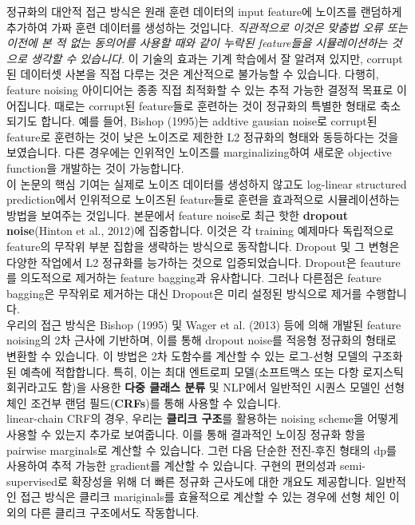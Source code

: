 \documentclass{article}
\begin{document}
정규화의 대안적 접근 방식은 원래 훈련 데이터의 input feature에 노이즈를 랜덤하게 추가하여 가짜 훈련 데이터를 생성하는 것입니다. \textit{직관적으로 이것은 맞춤법 오류 또는 이전에 본 적 없는 동의어를 사용할 때와 같이 누락된 feature들을 시뮬레이션하는 것으로 생각할 수 있습니다.} 이 기술의 효과는 기계 학습에서 잘 알려져 있지만, corrupt된 데이터셋 사본을 직접 다루는 것은 계산적으로 불가능할 수 있습니다. 다행히, feature noising 아이디어는 종종 직접 최적화할 수 있는 추적 가능한 결정적 목표로 이어집니다. 때로는 corrupt된 feature들로 훈련하는 것이 정규화의 특별한 형태로 축소되기도 합니다. 예를 들어, Bishop (1995)는 addtive gausian noise로 corrupt된 feature로 훈련하는 것이 낮은 노이즈로 제한한 L2 정규화의 형태와 동등하다는 것을 보였습니다. 다른 경우에는 인위적인 노이즈를 marginalizing하여 새로운 objective function을 개발하는 것이 가능합니다.\\

이 논문의 핵심 기여는 실제로 노이즈 데이터를 생성하지 않고도 log-linear structured prediction에서 인위적으로 노이즈된 feature들로 훈련을 효과적으로 시뮬레이션하는 방법을 보여주는 것입니다. 본문에서 feature noise로 최근 핫한 \textbf{dropout noise}(Hinton et al., 2012)에 집중합니다. 이것은 각 training 예제마다 독립적으로 feature의 무작위 부분 집합을 생략하는 방식으로 동작합니다. Dropout 및 그 변형은 다양한 작업에서 L2 정규화를 능가하는 것으로 입증되었습니다. Dropout은 feauture를 의도적으로 제거하는 feature bagging과 유사합니다. 그러나 다른점은 feature bagging은 무작위로 제거하는 대신 Dropout은 미리 설정된 방식으로 제거를 수행합니다.\\

우리의 접근 방식은 Bishop (1995) 및 Wager et al. (2013) 등에 의해 개발된 feature noising의 2차 근사에 기반하며, 이를 통해 dropout noise를 적응형 정규화의 형태로 변환할 수 있습니다. 이 방법은 2차 도함수를 계산할 수 있는 로그-선형 모델의 구조화된 예측에 적합합니다. 특히, 이는 최대 엔트로피 모델(소프트맥스 또는 다항 로지스틱 회귀라고도 함)을 사용한 \textbf{다중 클래스 분류} 및 NLP에서 일반적인 시퀀스 모델인 선형 체인 조건부 랜덤 필드(\textbf{CRFs})를 통해 사용할 수 있습니다.\\

linear-chain CRF의 경우, 우리는 \textbf{클리크 구조}를 활용하는 noising scheme을 어떻게 사용할 수 있는지 추가로 보여줍니다. 이를 통해 결과적인 노이징 정규화 항을 pairwise marginals로 계산할 수 있습니다. 그런 다음 단순한 전진-후진 형태의 dp를 사용하여 추적 가능한 gradient를 계산할 수 있습니다. 구현의 편의성과 semi-supervised로 확장성을 위해 더 빠른 정규화 근사도에 대한 개요도 제공합니다. 일반적인 접근 방식은 클리크 mariginals를 효율적으로 계산할 수 있는 경우에 선형 체인 이외의 다른 클리크 구조에서도 작동합니다.\\
\end{document}
